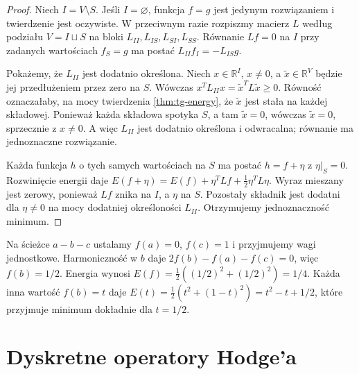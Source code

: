 \begin{proof}
Niech $I=V\setminus S$. Jeśli $I=\varnothing$, funkcja $f=g$
jest jedynym rozwiązaniem i twierdzenie jest oczywiste.
W przeciwnym razie rozpiszmy macierz $L$ według podziału
$V=I\sqcup S$ na bloki $L_{II},L_{IS},L_{SI},L_{SS}$.
Równanie $Lf=0$ na $I$ przy zadanych wartościach
$f_S=g$ ma postać $L_{II}f_I=-L_{IS}g$.

Pokażemy, że $L_{II}$ jest dodatnio określona. Niech
$x\in\mathbb R^I$, $x\ne0$, a $\widetilde x\in\mathbb R^V$
będzie jej przedłużeniem przez zero na $S$.
Wówczas $x^TL_{II}x=\widetilde x^TL\widetilde x\ge0$.
Równość oznaczałaby, na mocy twierdzenia
\ref{thm:tg-energy}, że $\widetilde x$ jest stała
na każdej składowej. Ponieważ każda składowa spotyka $S$,
a tam $\widetilde x=0$, wówczas $\widetilde x=0$,
sprzecznie z $x\ne0$. A więc $L_{II}$ jest dodatnio
określona i odwracalna; równanie ma jednoznaczne rozwiązanie.

Każda funkcja $h$ o tych samych wartościach na $S$
ma postać $h=f+\eta$ z $\eta|_S=0$.
Rozwinięcie energii daje
$E(f+\eta)=E(f)+\eta^TLf+\tfrac12\eta^TL\eta$.
Wyraz mieszany jest zerowy, ponieważ $Lf$ znika na
$I$, a $\eta$ na $S$. Pozostały składnik jest dodatni
dla $\eta\ne0$ na mocy dodatniej określoności $L_{II}$.
Otrzymujemy jednoznaczność minimum.
\end{proof}

\begin{przyklad}
Na ścieżce $a-b-c$ ustalamy $f(a)=0$, $f(c)=1$
i przyjmujemy wagi jednostkowe. Harmoniczność w $b$ daje
$2f(b)-f(a)-f(c)=0$, więc $f(b)=1/2$.
Energia wynosi $E(f)=\tfrac12((1/2)^2+(1/2)^2)=1/4$.
Każda inna wartość $f(b)=t$ daje
$E(t)=\tfrac12(t^2+(1-t)^2)=t^2-t+1/2$,
które przyjmuje minimum dokładnie dla $t=1/2$.
\end{przyklad}

\begin{center}
\end{center}

\section{Dyskretne operatory Hodge'a}
\label{sec:tg-hodge-operators}

